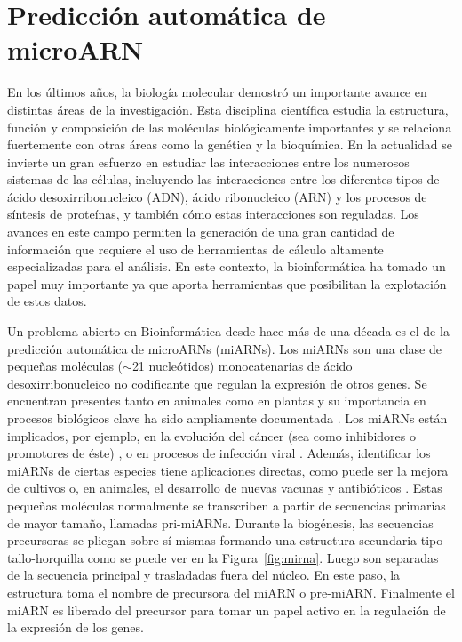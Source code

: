 \section{Predicción automática de microARN}

En los últimos años, la biología molecular demostró un importante avance en distintas áreas de la investigación. Esta disciplina científica estudia la
estructura, función y composición de las moléculas biológicamente importantes y se relaciona fuertemente con otras áreas como la genética y la bioquímica. En la
actualidad se invierte un gran esfuerzo en estudiar las interacciones entre los numerosos sistemas de las células, incluyendo las interacciones entre los
diferentes tipos de ácido desoxirribonucleico (ADN), ácido ribonucleico (ARN) y los procesos de síntesis de proteínas, y también cómo estas interacciones son
reguladas. Los avances en este campo permiten la generación de una gran cantidad de información que requiere el uso de herramientas de cálculo altamente
especializadas para el análisis. En este contexto, la bioinformática ha tomado un papel muy importante ya que aporta herramientas que posibilitan la explotación
de estos datos.

Un problema abierto en Bioinformática desde hace más de una década es el de la predicción automática de microARNs (miARNs). Los miARNs son una clase de pequeñas
moléculas ($\sim$21 nucleótidos) monocatenarias de ácido desoxirribonucleico no codificante que regulan la expresión de otros genes. Se encuentran presentes
tanto en animales como en plantas y su importancia en procesos biológicos clave ha sido ampliamente documentada \citep{rosenzvit2013microrna}. Los miARNs están
implicados, por ejemplo, en la evolución del cáncer (sea como inhibidores o promotores de éste) \citep{yu2015microrna}, o en procesos de infección viral
\citep{lecellier2005}. Además, identificar los miARNs de ciertas especies tiene aplicaciones directas, como puede ser la mejora de cultivos \citep{liu2010new}
o, en animales, el desarrollo de nuevas vacunas y antibióticos \citep{tsetsarkin2017synergistic}. Estas pequeñas moléculas normalmente se transcriben a partir
de secuencias primarias de mayor tamaño, llamadas pri-miARNs. Durante la biogénesis, las secuencias precursoras se pliegan sobre sí mismas formando una
estructura secundaria tipo tallo-horquilla como se puede ver en la Figura~\ref{fig:mirna}. Luego son separadas de la secuencia principal y trasladadas fuera del
núcleo. En este paso, la estructura toma el nombre de precursora del miARN o pre-miARN. Finalmente el miARN es liberado del precursor para tomar un papel activo
en la regulación de la expresión de los genes.

